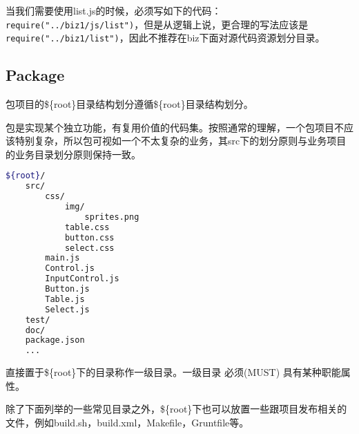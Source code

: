 当我们需要使用list.js的时候，必须写如下的代码：\texttt{require("../biz1/js/list")}，但是从逻辑上说，更合理的写法应该是\texttt{require("../biz1/list")}，因此不推荐在biz下面对源代码资源划分目录。


\subsection{Package}


包项目的\$\{root\}目录结构划分遵循\$\{root\}目录结构划分。

包是实现某个独立功能，有复用价值的代码集。按照通常的理解，一个包项目不应该特别复杂，所以包可视如一个不太复杂的业务，其src下的划分原则与业务项目的业务目录划分原则保持一致。




\begin{lstlisting}[language=bash]
${root}/
    src/
        css/
            img/
                sprites.png
            table.css
            button.css
            select.css
        main.js
        Control.js
        InputControl.js
        Button.js
        Table.js
        Select.js
    test/
    doc/
    package.json
    ...
\end{lstlisting}


直接置于\$\{root\}下的目录称作一级目录。一级目录 必须(MUST) 具有某种职能属性。

除了下面列举的一些常见目录之外，\$\{root\}下也可以放置一些跟项目发布相关的文件，例如build.sh，build.xml，Makefile，Gruntfile等。

